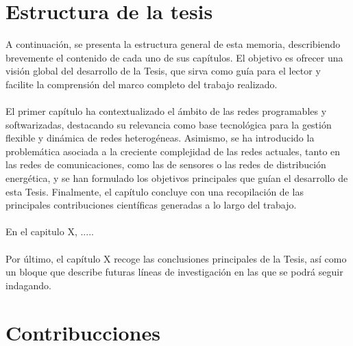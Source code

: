 \section{Estructura de la tesis}

A continuación, se presenta la estructura general de esta memoria, describiendo brevemente el contenido de cada uno de sus capítulos. El objetivo es ofrecer una visión global del desarrollo de la Tesis, que sirva como guía para el lector y facilite la comprensión del marco completo del trabajo realizado.\\
\\
El primer capítulo ha contextualizado el ámbito de las redes programables y softwarizadas, destacando su relevancia como base tecnológica para la gestión flexible y dinámica de redes heterogéneas. Asimismo, se ha introducido la problemática asociada a la creciente complejidad de las redes actuales, tanto en las redes de comunicaciones, como las de sensores o las redes de distribución energética, y se han formulado los objetivos principales que guían el desarrollo de esta Tesis. Finalmente, el capítulo concluye con una recopilación de las principales contribuciones científicas generadas a lo largo del trabajo.\\
\\
En el capitulo X, .....\\
\\
Por último, el capítulo X recoge las conclusiones principales de la Tesis, así como un bloque que describe futuras líneas de investigación en las que se podrá seguir indagando.


\section{Contribucciones}

